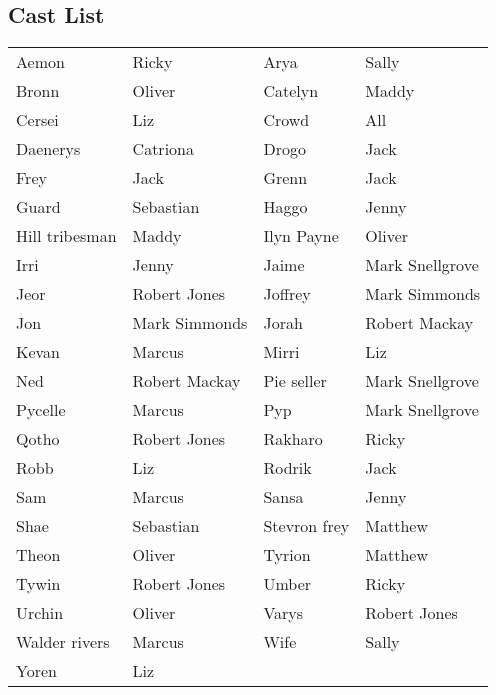 \subsection*{Cast List}
\begin{tabular}{ll|ll}\\
Aemon & Ricky &  Arya & Sally\\
Bronn & Oliver &  Catelyn & Maddy\\
Cersei & Liz &  Crowd & All\\
Daenerys & Catriona &  Drogo & Jack\\
Frey & Jack &  Grenn & Jack\\
Guard & Sebastian &  Haggo & Jenny\\
Hill tribesman & Maddy &  Ilyn Payne & Oliver\\
Irri & Jenny &  Jaime & Mark Snellgrove\\
Jeor & Robert Jones &  Joffrey & Mark Simmonds\\
Jon & Mark Simmonds &  Jorah & Robert Mackay\\
Kevan & Marcus &  Mirri & Liz\\
Ned & Robert Mackay &  Pie seller & Mark Snellgrove\\
Pycelle & Marcus &  Pyp & Mark Snellgrove\\
Qotho & Robert Jones &  Rakharo & Ricky\\
Robb & Liz &  Rodrik & Jack\\
Sam & Marcus &  Sansa & Jenny\\
Shae & Sebastian &  Stevron frey & Matthew\\
Theon & Oliver &  Tyrion & Matthew\\
Tywin & Robert Jones &  Umber & Ricky\\
Urchin & Oliver &  Varys & Robert Jones\\
Walder rivers & Marcus &  Wife & Sally\\
Yoren & Liz &  \end{tabular}
